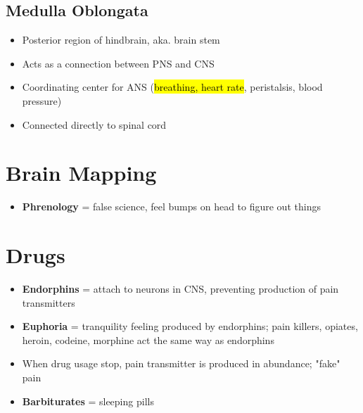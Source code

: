 \documentclass[a4paper,12pt]{article}
\begin{document}
\subsection{Medulla Oblongata}
\begin{itemize}
    \item{Posterior region of hindbrain, aka. brain stem}
    \item{Acts as a connection between PNS and CNS}
    \item{Coordinating center for ANS (\hl{breathing, heart rate}, peristalsis, blood pressure)}
    \item{Connected directly to spinal cord}
\end{itemize}

\section{Brain Mapping}
\begin{itemize}
    \item{\textbf{Phrenology} = false science, feel bumps on head to figure out things}
\end{itemize}

\section{Drugs}
\begin{itemize}
    \item{\textbf{Endorphins} = attach to neurons in CNS, preventing production of pain transmitters}
    \item{\textbf{Euphoria} = tranquility feeling produced by endorphins; pain killers, opiates, heroin, codeine, morphine act the same way as endorphins}
    \item{When drug usage stop, pain transmitter is produced in abundance; "fake" pain}
    \item{\textbf{Barbiturates} = sleeping pills}
\end{itemize}
\end{document}
